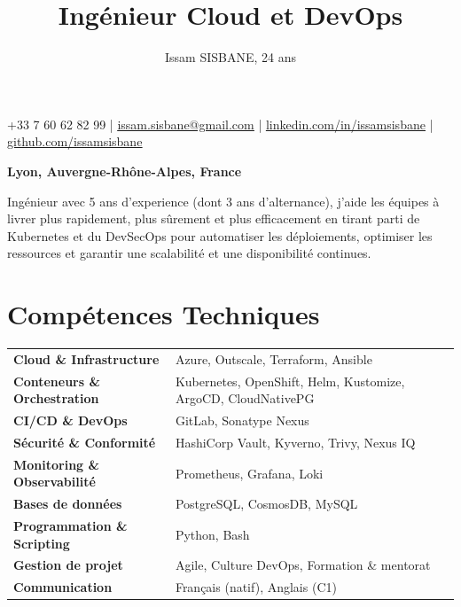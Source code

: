 \documentclass{article}
\title{Ingénieur Cloud et DevOps}
\author{Issam SISBANE, 24 ans}
\date{}
\begin{document}
\maketitle
\thispagestyle{empty} %
\vspace{-4em}

\begin{center}
+33 7 60 62 82 99 | \href{mailto:issam.sisbane@gmail.com}{\underline{issam.sisbane@gmail.com}} | \href{https://linkedin.com/in/issamsisbane}{\underline{linkedin.com/in/issamsisbane}} | \href{https://github.com/issamsisbane}{\underline{github.com/issamsisbane}}
\end{center}
\begin{center}
\textbf{Lyon, Auvergne-Rhône-Alpes, France}
\end{center}


\begin{center}
Ingénieur avec 5 ans d'experience (dont 3 ans d'alternance), j’aide les équipes à livrer plus rapidement, plus sûrement et plus efficacement en tirant parti de Kubernetes et du DevSecOps pour automatiser les déploiements, optimiser les ressources et garantir une scalabilité et une disponibilité continues.
\end{center}

\section*{Compétences Techniques}
\begin{tabularx}{\textwidth}{@{}lX@{}}
  \textbf{Cloud \& Infrastructure} & Azure, Outscale, Terraform, Ansible \\
  \addlinespace[2pt]
  \textbf{Conteneurs \& Orchestration} & Kubernetes, OpenShift, Helm, Kustomize, ArgoCD, CloudNativePG \\
  \addlinespace[2pt]
  \textbf{CI/CD \& DevOps} & GitLab, Sonatype Nexus \\
  \addlinespace[2pt]
  \textbf{Sécurité \& Conformité} & HashiCorp Vault, Kyverno, Trivy, Nexus IQ \\
  \addlinespace[2pt]
  \textbf{Monitoring \& Observabilité} & Prometheus, Grafana, Loki \\
  \addlinespace[2pt]
  \textbf{Bases de données} & PostgreSQL, CosmosDB, MySQL \\
  \addlinespace[2pt]
  \textbf{Programmation \& Scripting} & Python, Bash \\
  \addlinespace[2pt]
  \textbf{Gestion de projet} & Agile, Culture DevOps, Formation \& mentorat \\
  \addlinespace[2pt]
  \textbf{Communication} & Français (natif), Anglais (C1) \\
\end{tabularx}
\end{document}
